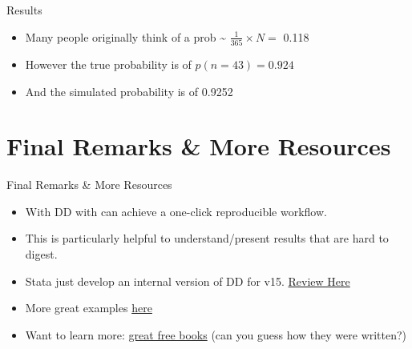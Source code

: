 \documentclass[ignorenonframetext,]{beamer}
\providecommand{\tightlist}{%
\setlength{\itemsep}{0pt}\setlength{\parskip}{0pt}}
\begin{document}
\begin{frame}{Results}

\begin{itemize}
\tightlist
\item
  Many people originally think of a prob \textasciitilde{}
  \(\frac{1}{365} \times N =\) 0.118
\item
  However the true probability is of \(p(n= 43) = 0.924\)
\item
  And the simulated probability is of 0.9252
\end{itemize}

\end{frame}

\section{Final Remarks \& More
Resources}\label{final-remarks-more-resources}

\begin{frame}{Final Remarks \& More Resources}

\begin{itemize}
\tightlist
\item
  With DD with can achieve a one-click reproducible workflow.
\item
  This is particularly helpful to understand/present results that are
  hard to digest.
\item
  Stata just develop an internal version of DD for v15.
  \href{https://www.bitss.org/2017/09/05/review-of-statas-dyndoc/}{Review
  Here}
\item
  More great examples \href{}{here}
\item
  Want to learn more: \href{https://bookdown.org/}{great free books}
  (can you guess how they were written?)
\end{itemize}

\end{frame}
\end{document}

